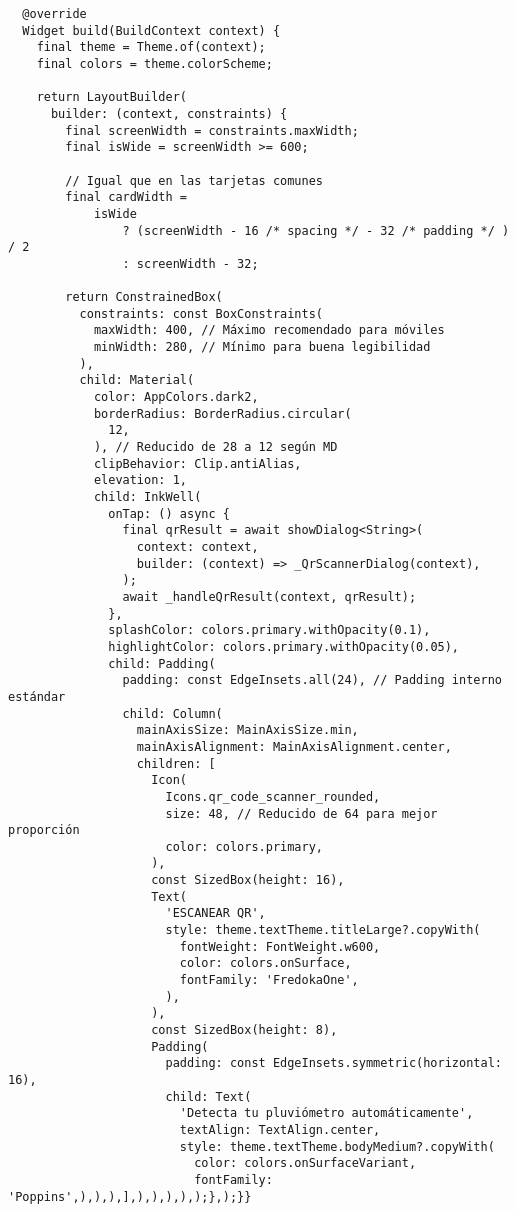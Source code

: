 \begin{verbatim}
  @override
  Widget build(BuildContext context) {
    final theme = Theme.of(context);
    final colors = theme.colorScheme;

    return LayoutBuilder(
      builder: (context, constraints) {
        final screenWidth = constraints.maxWidth;
        final isWide = screenWidth >= 600;

        // Igual que en las tarjetas comunes
        final cardWidth =
            isWide
                ? (screenWidth - 16 /* spacing */ - 32 /* padding */ ) / 2
                : screenWidth - 32;

        return ConstrainedBox(
          constraints: const BoxConstraints(
            maxWidth: 400, // Máximo recomendado para móviles
            minWidth: 280, // Mínimo para buena legibilidad
          ),
          child: Material(
            color: AppColors.dark2,
            borderRadius: BorderRadius.circular(
              12,
            ), // Reducido de 28 a 12 según MD
            clipBehavior: Clip.antiAlias,
            elevation: 1,
            child: InkWell(
              onTap: () async {
                final qrResult = await showDialog<String>(
                  context: context,
                  builder: (context) => _QrScannerDialog(context),
                );
                await _handleQrResult(context, qrResult);
              },
              splashColor: colors.primary.withOpacity(0.1),
              highlightColor: colors.primary.withOpacity(0.05),
              child: Padding(
                padding: const EdgeInsets.all(24), // Padding interno estándar
                child: Column(
                  mainAxisSize: MainAxisSize.min,
                  mainAxisAlignment: MainAxisAlignment.center,
                  children: [
                    Icon(
                      Icons.qr_code_scanner_rounded,
                      size: 48, // Reducido de 64 para mejor proporción
                      color: colors.primary,
                    ),
                    const SizedBox(height: 16),
                    Text(
                      'ESCANEAR QR',
                      style: theme.textTheme.titleLarge?.copyWith(
                        fontWeight: FontWeight.w600,
                        color: colors.onSurface,
                        fontFamily: 'FredokaOne',
                      ),
                    ),
                    const SizedBox(height: 8),
                    Padding(
                      padding: const EdgeInsets.symmetric(horizontal: 16),
                      child: Text(
                        'Detecta tu pluviómetro automáticamente',
                        textAlign: TextAlign.center,
                        style: theme.textTheme.bodyMedium?.copyWith(
                          color: colors.onSurfaceVariant,
                          fontFamily: 'Poppins',),),),],),),),),);},);}}


\end{verbatim}
